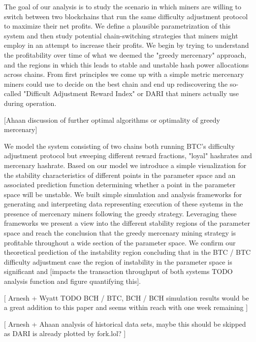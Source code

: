 \documentclass[10pt, preprint]{aastex}
\begin{document}
The goal of our analysis is to study the scenario in which miners are willing to switch between two blockchains that run the same difficulty adjustment protocol to maximize their net profits.  We define a plausible parametrization of this system and then study potential chain-switching strategies that miners might employ in an attempt to increase their profits.  We begin by trying to understand the profitability over time of what we deemed the "greedy mercenary" approach, and the regions in which this leads to stable and unstable hash power allocations across chains.  From first principles we come up with a simple metric mercenary miners could use to decide on the best chain and end up rediscovering the so-called "Difficult Adjustment Reward Index" or DARI that miners actually use during operation. 

[Ahaan discussion of further optimal algorithms or optimality of greedy mercenary]

We model the system consisting of two chains both running BTC's difficulty adjustment protocol but sweeping different reward fractions, "loyal" hashrates and mercenary hashrate.  Based on our model we introduce a simple visualization for the stability characteristics of different points in the parameter space and an associated prediction function determining whether a point in the parameter space will be unstable. We built simple simulation and analysis frameworks for generating and interpreting data representing execution of these systems in the presence of mercenary miners following the greedy strategy.  Leveraging these frameworks we present a view into the different stability regions of the parameter space and reach the conclusion that the greedy mercenary mining strategy is profitable throughout a wide section of the parameter space.  We confirm our theoretical prediction of the instability region concluding that in the BTC / BTC difficulty adjustment case the region of instability in the parameter space is significant and  [impacts the transaction throughput of both systems TODO analysis function and figure quantifying this]. 

[ Arnesh + Wyatt TODO BCH / BTC, BCH / BCH simulation results would be a great addition to this paper and seems within reach with one week remaining ] 

[ Arnesh + Ahaan analysis of historical data sets, maybe this should be skipped as DARI is already plotted by fork.lol? ]
\end{document}
